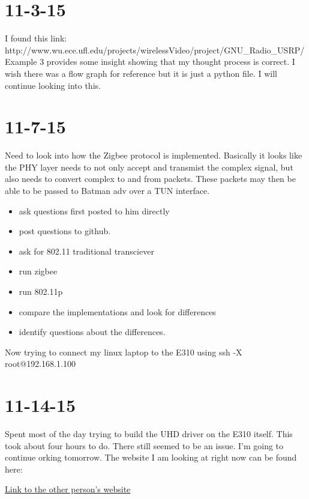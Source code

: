 \documentclass{article}
\begin{document}
	\section{11-3-15}
	I found this link: http://www.wu.ece.ufl.edu/projects/wirelessVideo/project/GNU\_Radio\_USRP/
	Example 3 provides some insight showing that my thought process is correct. I wish there was a flow graph for reference but it is just a python file. I will continue looking into
	this.

	\section{11-7-15}
	Need to look into how the Zigbee protocol is implemented. Basically it looks like the PHY layer needs to not only accept and transmist the complex
	signal, but also needs to convert complex to and from packets. These packets may then be able to be passed to Batman adv over a TUN interface. 
	
	\begin{itemize}
	\item ask questions first posted to him directly
	\item post questions to github. 
	\item ask for 802.11 traditional transciever
	\item run zigbee
	\item run 802.11p
	\item compare the implementations and look for differences
	\item identify questions about the differences. 
	\end{itemize}

	Now trying to connect my linux laptop to the E310 using ssh -X root@192.168.1.100
	
	\section{11-14-15}
	Spent most of the day trying to build the UHD driver on the E310 itself. This took about four hours to do. There still seemed to be an issue.
	I'm going to continue orking tomorrow. The website I am looking at right now can be found here:

	\href{https://sdradventure.wordpress.com/2015/01/}{Link to the other person's website}
\end{document}
